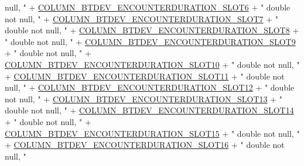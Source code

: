 \begin{DoxyCode}
{       null, "}
              + \hyperlink{classcom_1_1copelabs_1_1oiframework_1_1socialproximity_1_1_s_q_lite_helper_a28b277aecd4b5af8c05909bc3228db5f}{COLUMN\_BTDEV\_ENCOUNTERDURATION\_SLOT6} + \textcolor{stringliteral}{" double not
       null, "}
              + \hyperlink{classcom_1_1copelabs_1_1oiframework_1_1socialproximity_1_1_s_q_lite_helper_ac9d86b61d1797abeaf26b2a79b46953d}{COLUMN\_BTDEV\_ENCOUNTERDURATION\_SLOT7} + \textcolor{stringliteral}{" double not
       null, "}
              + \hyperlink{classcom_1_1copelabs_1_1oiframework_1_1socialproximity_1_1_s_q_lite_helper_a3c3c339ebd629e17b3213ca2f68c4ebd}{COLUMN\_BTDEV\_ENCOUNTERDURATION\_SLOT8} + \textcolor{stringliteral}{" double not
       null, "}
              + \hyperlink{classcom_1_1copelabs_1_1oiframework_1_1socialproximity_1_1_s_q_lite_helper_aa83e807bb41ffcbe2d4def924ab1e348}{COLUMN\_BTDEV\_ENCOUNTERDURATION\_SLOT9} + \textcolor{stringliteral}{" double not
       null, "}
              + \hyperlink{classcom_1_1copelabs_1_1oiframework_1_1socialproximity_1_1_s_q_lite_helper_a44cdf46d6a1763bf54a61c202188312d}{COLUMN\_BTDEV\_ENCOUNTERDURATION\_SLOT10} + \textcolor{stringliteral}{" double not
       null, "}
              + \hyperlink{classcom_1_1copelabs_1_1oiframework_1_1socialproximity_1_1_s_q_lite_helper_add0e848d049869ca8b058fd6f8465f63}{COLUMN\_BTDEV\_ENCOUNTERDURATION\_SLOT11} + \textcolor{stringliteral}{" double not
       null, "}
              + \hyperlink{classcom_1_1copelabs_1_1oiframework_1_1socialproximity_1_1_s_q_lite_helper_a6fc6ec1c8e4a832378c2481ef7510642}{COLUMN\_BTDEV\_ENCOUNTERDURATION\_SLOT12} + \textcolor{stringliteral}{" double not
       null, "}
              + \hyperlink{classcom_1_1copelabs_1_1oiframework_1_1socialproximity_1_1_s_q_lite_helper_ae870950e44e1f97bfb360d1619b75796}{COLUMN\_BTDEV\_ENCOUNTERDURATION\_SLOT13} + \textcolor{stringliteral}{" double not
       null, "}
              + \hyperlink{classcom_1_1copelabs_1_1oiframework_1_1socialproximity_1_1_s_q_lite_helper_a4b653e54a4fe2c7a5b446abbed929aa3}{COLUMN\_BTDEV\_ENCOUNTERDURATION\_SLOT14} + \textcolor{stringliteral}{" double not
       null, "}
              + \hyperlink{classcom_1_1copelabs_1_1oiframework_1_1socialproximity_1_1_s_q_lite_helper_af8916712e22421bfb27c17934dc19bf6}{COLUMN\_BTDEV\_ENCOUNTERDURATION\_SLOT15} + \textcolor{stringliteral}{" double not
       null, "}
              + \hyperlink{classcom_1_1copelabs_1_1oiframework_1_1socialproximity_1_1_s_q_lite_helper_a4ef85302cf258bdda8ab288488a27614}{COLUMN\_BTDEV\_ENCOUNTERDURATION\_SLOT16} + \textcolor{stringliteral}{" double not
       null, "}

\end{DoxyCode}
